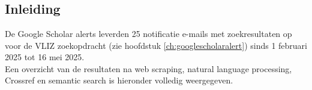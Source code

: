 
\chapter{}%
\label{ch:resultaten}

\section{Inleiding}
De Google Scholar alerts leverden 25 notificatie e-mails met zoekresultaten op voor de VLIZ zoekopdracht (zie hoofdstuk \ref{ch:googlescholaralert}) sinds 1 februari 2025 tot 16 mei 2025.\\
Een overzicht van de resultaten na web scraping, natural language processing, Crossref en semantic search is hieronder volledig weergegeven.


